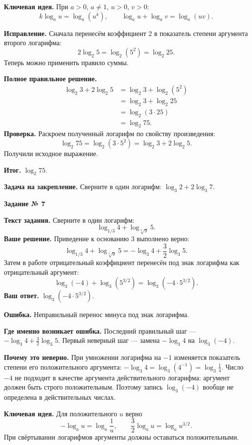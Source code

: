 \documentclass[a4paper,12pt]{article}
\newcommand{\keyidea}{\textcolor{darkaccent}{\textbf{Ключевая идея.}}}
\newcommand{\err}{\textcolor{alert}{\textbf{Ошибка.}}}
\newcommand{\result}{\textcolor{darkaccent}{\textbf{Итог.}}}
\newcommand{\taskheading}[1]{\begin{center}\Large\bfseries Задание № #1\end{center}\vspace{3mm}}
\begin{document}
\keyidea{} При $a>0$, $a\ne1$, $u>0$, $v>0$:
\[
k\log_a u=\log_a(u^k),\qquad
\log_a u+\log_a v=\log_a(uv).
\]

\textbf{Исправление.} Сначала перенесём коэффициент $2$ в показатель степени аргумента второго логарифма:
\[
2\log_2 5=\log_2(5^2)=\log_2 25.
\]
Теперь можно применить правило суммы.

\textbf{Полное правильное решение.}
\begin{align*}
\log_2 3+2\log_2 5
  &=\log_2 3+\log_2(5^2)\\
  &=\log_2 3+\log_2 25\\
  &=\log_2(3\cdot25)\\
  &=\log_2 75.
\end{align*}
\textbf{Проверка.} Раскроем полученный логарифм по свойству произведения:
\[
\log_2 75=\log_2(3\cdot5^2)=\log_2 3+2\log_2 5.
\]
Получили исходное выражение.

\result{} $\boxed{\log_2 75}$.

\vspace{3mm}
\textbf{Задача на закрепление.} Сверните в один логарифм:
$\log_3 2+2\log_3 7$.
\newpage
{}\label{task:7}
\begingroup
\small
\setlength{\parskip}{3pt}
\setlength{\abovedisplayskip}{5pt}
\setlength{\belowdisplayskip}{5pt}
\setlength{\abovedisplayshortskip}{3pt}
\setlength{\belowdisplayshortskip}{3pt}
\taskheading{7}
\textbf{Текст задания.} Сверните в один логарифм:
\[
\log_{1/3}4+\log_{\sqrt[3]{9}}5.
\]
\textbf{Ваше решение.} Приведение к основанию $3$ выполнено верно:
\[
\log_{1/3}4+\log_{\sqrt[3]{9}}5
=-\log_3 4+\frac32\log_3 5.
\]
Затем в работе отрицательный коэффициент перенесён под знак логарифма как отрицательный аргумент:
\[
\log_3(-4)+\log_3\!\left(5^{3/2}\right)
=\log_3\!\left(-4\cdot5^{3/2}\right).
\]
\textbf{Ваш ответ.} $\log_3(-4\cdot5^{3/2})$.

\err{} Неправильный перенос минуса под знак логарифма.

\textbf{Где именно возникает ошибка.} Последний правильный шаг --- $-\log_3 4+\tfrac32\log_3 5$. Первый неверный шаг --- замена $-\log_3 4$ на $\log_3(-4)$.

\textbf{Почему это неверно.} При умножении логарифма на $-1$ изменяется показатель степени его положительного аргумента: $-\log_3 4=\log_3(4^{-1})=\log_3\tfrac14$. Число $-4$ не подходит в качестве аргумента действительного логарифма: аргумент должен быть строго положительным. Поэтому запись $\log_3(-4)$ вообще не определена в действительных числах.

\keyidea{} Для положительного $u$ верно
\[
-\log_a u=\log_a\frac1u,
\qquad\frac32\log_a u=\log_a u^{3/2}.
\]
При свёртывании логарифмов аргументы должны оставаться положительными.
\end{document}
